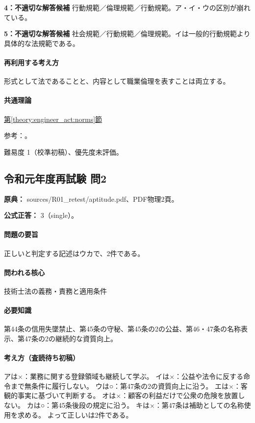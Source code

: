 \noindent\textbf{4：不適切な解答候補} 行動規範／倫理規範／行動規範。ア・イ・ウの区別が崩れている。\par

\noindent\textbf{5：不適切な解答候補} 社会規範／行動規範／倫理規範。イは一般的行動規範より具体的な法規範である。\par

\paragraph{再利用する考え方} 形式として法であることと、内容として職業倫理を表すことは両立する。

\paragraph{共通理論} \hyperref[theory:engineer_act:norms]{第\ref*{theory:engineer_act:norms}節}

\par 参考：\cite{engineer_act_current}。

\par 難易度 1（校準初稿）、優先度未評価。

\subsection{令和元年度再試験 問2}
\label{q:r01-ret-apt-02}

\noindent\textbf{原典：} sources/R01\_retest/aptitude.pdf、PDF物理2頁。

\textbf{公式正答：} 3（single）。

\paragraph{問題の要旨} 正しいと判定する記述はウカで、2件である。

\paragraph{問われる核心} 技術士法の義務・責務と適用条件

\paragraph{必要知識} 第44条の信用失墜禁止、第45条の守秘、第45条の2の公益、第46・47条の名称表示、第47条の2の継続的な資質向上。

\paragraph{考え方（査読待ち初稿）} アは×：業務に関する登録領域も継続して学ぶ。 イは×：公益や法令に反する命令まで無条件に履行しない。 ウは○：第47条の2の資質向上に沿う。 エは×：客観的事実に基づいて判断する。 オは×：顧客の利益だけで公衆の危険を放置しない。 カは○：第45条後段の規定に沿う。 キは×：第47条は補助としての名称使用を求める。 よって正しいは2件である。

